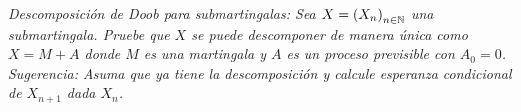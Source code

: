 \emph{
	Descomposici\'on de Doob para submartingalas: Sea $X=\left( X_n\right) _{n\in\mathbb{N}}$ una submartingala. 
	Pruebe que $X$ se puede descomponer de manera \'unica como $X=M+A$ donde $M$ es una martingala y $A$ 
	es un proceso previsible con $A_0=0$. Sugerencia: Asuma que ya tiene la descomposici\'on y calcule 
	esperanza condicional de $X_{n+1}$ dada $X_n$. 
}